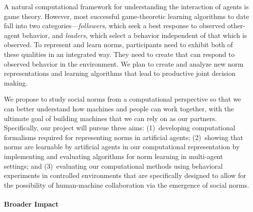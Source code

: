 A natural computational framework for understanding the interaction of
agents is game theory. However, most successful game-theoretic
learning algorithms to date fall into two
categories---\emph{followers}, which seek a best response to observed
other-agent behavior, and \emph{leaders}, which select a behavior
independent of that which is observed. To represent and learn norms,
participants need to exhibit both of these qualities in an integrated
way. They need to create  that can respond to
observed behavior in the environment. We plan to create and analyze
new norm representations and learning algorithms that lead to
productive joint decision making.


We propose to study social norms from a computational perspective so
that we can better understand how machines and people can work
together, with the ultimate goal of building machines that we can rely
on as our partners. Specifically, our project will pursue three aims:
%
(1)~developing computational formalisms required for representing
norms in artificial agents; (2)~showing that norms are learnable by
artificial agents in our computational representation by implementing
and evaluating algorithms for norm learning in multi-agent settings;
and (3)~evaluating our computational methods using behavioral
experiments in controlled environments that are specifically designed
to allow for the possibility of human-machine collaboration via the
emergence of social norms.

\vspace{\up}
\paragraph{Broader Impact}



